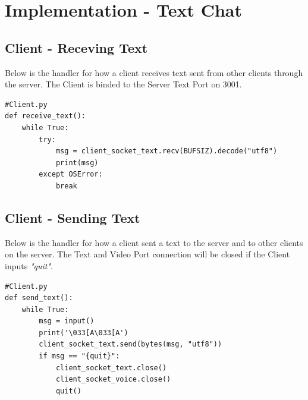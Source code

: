 \documentclass[a4paper,11pt]{article}
\begin{document}
\section{Implementation - Text Chat}

\subsection{Client - Receving Text }
Below is the handler for how a client receives text sent from other clients through the server. The Client is binded to the Server Text Port on 3001.
\begin{mdframed}[backgroundcolor=light-gray, roundcorner=30pt,leftmargin=1, rightmargin=1, innerleftmargin=5, innertopmargin=-3,innerbottommargin=5, outerlinewidth=1, linecolor=light-gray]
\begin{lstlisting}
#Client.py
def receive_text():
	while True:
		try:
			msg = client_socket_text.recv(BUFSIZ).decode("utf8")
			print(msg)
		except OSError:
			break
\end{lstlisting}
\end{mdframed}

\subsection{Client - Sending Text}
Below is the handler for how a client sent a text to the server and to other clients on the server. The Text and Video Port connection will be closed if the Client inputs \textit{"quit"}.
\begin{mdframed}[backgroundcolor=light-gray, roundcorner=30pt,leftmargin=1, rightmargin=1, innerleftmargin=5, innertopmargin=-3,innerbottommargin=5, outerlinewidth=1, linecolor=light-gray]
\begin{lstlisting}
#Client.py
def send_text():
	while True:
		msg = input()
		print('\033[A\033[A')
		client_socket_text.send(bytes(msg, "utf8"))
		if msg == "{quit}":
			client_socket_text.close()
			client_socket_voice.close()
			quit()
\end{lstlisting}
\end{mdframed}
\end{document}
